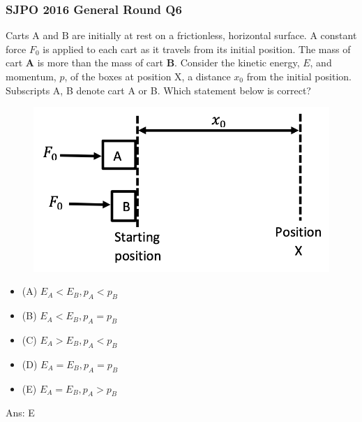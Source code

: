 \documentclass{article}
\begin{document}
\subsubsection{SJPO 2016 General Round Q6}
Carts $\mathrm{A}$ and $\mathrm{B}$ are initially at rest on a frictionless, horizontal surface. A constant force $F_0$ is applied to each cart as it travels from its initial position. The mass of cart $\mathbf{A}$ is more than the mass of cart $\mathbf{B}$. Consider the kinetic energy, $E$, and momentum, $p$, of the boxes at position $\mathrm{X}$, a distance $x_0$ from the initial position. Subscripts A, B denote cart A or B. Which statement below is correct?
{
\begin{figure}
\includegraphics[width=1.0\linewidth]{images/sjpo2016q6.png}
\end{figure}
\begin{itemize}
\item[] (A) $E_A<E_B, p_A<p_B$
\item[] (B) $E_A<E_B, p_A=p_B$
\item[] (C) $E_A>E_B, p_A<p_B$
\item[] (D) $E_A=E_B, p_A=p_B$
\item[] (E) $E_A=E_B, p_A>p_B$
\end{itemize}
}
Ans: \ifpaper E \fi

\newpage \clearpage
\end{document}
